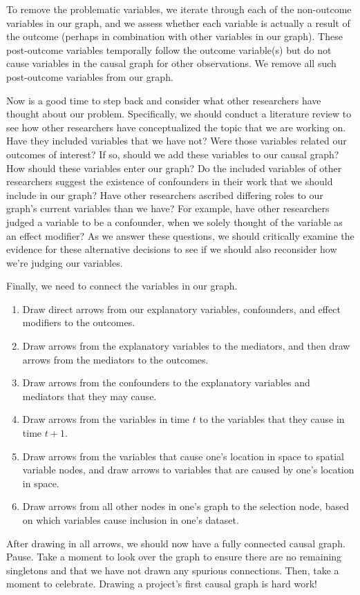 To remove the problematic variables, we iterate through each of the non-outcome variables in our graph, and we assess whether each variable is actually a result of the outcome (perhaps in combination with other variables in our graph).
These post-outcome variables temporally follow the outcome variable(s) but do not cause variables in the causal graph for other observations.
We remove all such post-outcome variables from our graph.

Now is a good time to step back and consider what other researchers have thought about our problem.
Specifically, we should conduct a literature review to see how other researchers have conceptualized the topic that we are working on.
Have they included variables that we have not?
Were those variables related our outcomes of interest?
If so, should we add these variables to our causal graph? How should these variables enter our graph?
Do the included variables of other researchers suggest the existence of confounders in their work that we should include in our graph?
Have other researchers ascribed differing roles to our graph's current variables than we have?
For example, have other researchers judged a variable to be a confounder, when we solely thought of the variable as an effect modifier?
As we answer these questions, we should critically examine the evidence for these alternative decisions to see if we should also reconsider how we're judging our variables.

Finally, we need to connect the variables in our graph.
\begin{enumerate}
   \item Draw direct arrows from our explanatory variables, confounders, and effect modifiers to the outcomes.
   \item Draw arrows from the explanatory variables to the mediators, and then draw arrows from the mediators to the outcomes.
   \item Draw arrows from the confounders to the explanatory variables and mediators that they may cause.
   \item Draw arrows from the variables in time $t$ to the variables that they cause in time $t+1$.
   \item Draw arrows from the variables that cause one's location in space to spatial variable nodes, and draw arrows to variables that are caused by one's location in space.
   \item Draw arrows from all other nodes in one's graph to the selection node, based on which variables cause inclusion in one's dataset.
\end{enumerate}
After drawing in all arrows, we should now have a fully connected causal graph.
Pause.
Take a moment to look over the graph to ensure there are no remaining singletons and that we have not drawn any spurious connections.
Then, take a moment to celebrate.
Drawing a project's first causal graph is hard work!

